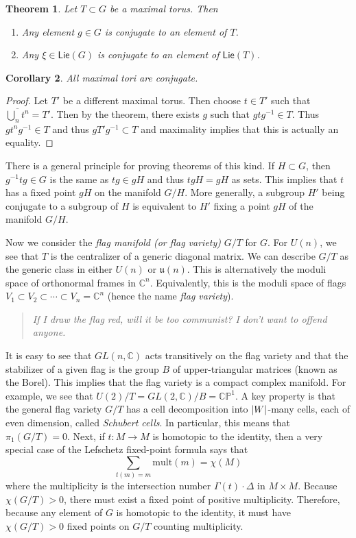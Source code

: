 \documentclass[leqno, openany]{memoir}
\newtheorem{thm}{Theorem}[section]
\newtheorem{cor}[thm]{Corollary}
\theoremstyle{definition}
\theoremstyle{remark}
\theoremstyle{plain}
\theoremstyle{definition}
\theoremstyle{remark}
\newcommand{\C}{\mathbb{C}}
\renewcommand{\P}{\mathbb{P}}
\newcommand{\mf}[1]{\mathfrak{#1}}
\newcommand{\mr}[1]{\mathrm{#1}}
\newcommand{\ms}[1]{\mathsf{#1}}
\newcommand{\ol}[1]{\overline{#1}}
\begin{document}
\begin{thm}
    Let $T \subset G$ be a maximal torus. Then
    \begin{enumerate}
        \item Any element $g \in G$ is conjugate to an element of $T$.
        \item Any $\xi \in \ms{Lie}(G)$ is conjugate to an element of $\ms{Lie}(T)$.
    \end{enumerate}
\end{thm}

\begin{cor}
    All maximal tori are conjugate.
\end{cor}

\begin{proof}
    Let $T'$ be a different maximal torus. Then choose $t \in T'$ such that $\ol{\bigcup_n t^n} = T'$. Then by the theorem, there exists $g$ such that $gtg^{-1} \in T$. Thus $g t^n g^{-1} \in T$ and thus $g T' g^{-1} \subset T$ and maximality implies that this is actually an equality.
\end{proof}

There is a general principle for proving theorems of this kind. If $H \subset G$, then $g^{-1} t g \in G$ is the same as $tg \in gH$ and thus $tgH = gH$ as sets. This implies that $t$ has a fixed point $gH$ on the manifold $G/H$. More generally, a subgroup $H'$ being conjugate to a subgroup of $H$ is equivalent to $H'$ fixing a point $gH$ of the manifold $G/H$.

Now we consider the \textit{flag manifold (or flag variety)} $G/T$ for $G$. For $U(n)$, we see that $T$ is the centralizer of a generic diagonal matrix. We can describe $G/T$ as the generic class in either $U(n)$ or $\mf{u}(n)$. This is alternatively the moduli space of orthonormal frames in $\C^n$. Equivalently, this is the moduli space of flags $V_1 \subset V_2 \subset \cdots \subset V_n = \C^n$ (hence the name \textit{flag variety}).

\begin{quotation}
    \itshape If I draw the flag red, will it be too communist? I don't want to offend anyone. 
\end{quotation}

It is easy to see that $GL(n, \C)$ acts transitively on the flag variety and that the stabilizer of a given flag is the group $B$ of upper-triangular matrices (known as the Borel). This implies that the flag variety is a compact complex manifold. For example, we see that $U(2)/T = GL(2, \C) / B = \C\P^1$. A key property is that the general flag variety $G/T$ has a cell decomposition into $\abs{W}$-many cells, each of even dimension, called \textit{Schubert cells}. In particular, this means that $\pi_1(G/T) = 0$. Next, if $t \colon M \to M$ is homotopic to the identity, then a very special case of the Lefschetz fixed-point formula says that
\[ \sum_{t(m) = m} \mr{mult}(m) = \chi(M) \]
where the multiplicity is the intersection number $\Gamma(t) \cdot \Delta$ in $M \times M$. Because $\chi(G/T) > 0$, there must exist a fixed point of positive multiplicity. Therefore, because any element of $G$ is homotopic to the identity, it must have $\chi(G/T) >0$ fixed points on $G/T$ counting multiplicity.
\end{document}

